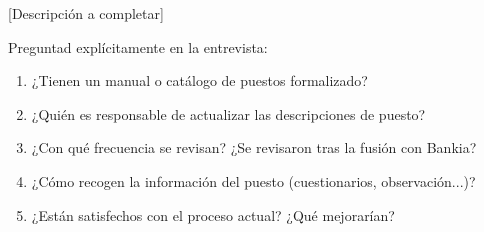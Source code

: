 
[Descripción a completar]

\begin{notaequipo}
  Preguntad explícitamente en la entrevista:
  \begin{enumerate}
    \item ¿Tienen un manual o catálogo de puestos formalizado?
    \item ¿Quién es responsable de actualizar las descripciones de puesto?
    \item ¿Con qué frecuencia se revisan? ¿Se revisaron tras la fusión con Bankia?
    \item ¿Cómo recogen la información del puesto (cuestionarios, observación...)?
    \item ¿Están satisfechos con el proceso actual? ¿Qué mejorarían?
  \end{enumerate}
\end{notaequipo}
